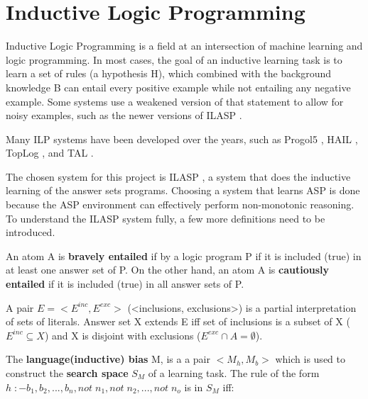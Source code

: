 
\section{Inductive Logic Programming}

Inductive Logic Programming \cite{RefWorks:RefID:42-muggleton1991inductive} is a field at an intersection of machine learning and logic programming.
In most cases, the goal of an inductive learning task is to learn a set of rules (a hypothesis H), which combined with the background knowledge B can entail every positive example while not entailing any negative example. 
Some systems use a weakened version of that statement to allow for noisy examples, such as the newer versions of ILASP \cite{RefWorks:RefID:55-law2018inductive}.

Many ILP systems have been developed over the years, such as Progol5 \cite{RefWorks:RefID:43-muggleton2000theory}, HAIL \cite{RefWorks:RefID:44-ray2003hybrid}, TopLog \cite{RefWorks:RefID:45-muggletontoplog:}, and TAL \cite{RefWorks:RefID:46-corapi2010inductive}.

The chosen system for this project is ILASP \cite{RefWorks:RefID:18-law2020ilasp}, a system that does the inductive learning of the answer sets programs.
Choosing a system that learns ASP is done because the ASP environment can effectively perform non-monotonic reasoning.\\

To understand the ILASP system fully, a few more definitions need to be introduced.

An atom A is \textbf{bravely entailed} if by a logic program P if it is included (true) in at least one answer set of P. 
On the other hand, an atom A is \textbf{cautiously entailed} if it is included (true) in all answer sets of P.

A pair $E = <E^{inc}, E^{exc}>$ (<inclusions, exclusions>) is a partial interpretation of sets of literals.
Answer set X extends E iff set of inclusions is a subset of X ($E^{inc} \subseteq X$) and X is disjoint with exclusions ($E^{exc} \cap A = \emptyset$).


The \textbf{language(inductive) bias} M, is a a pair $<M_h, M_b>$ which is used to construct the \textbf{search space} $S_M$ of a learning task.
The rule of the form  \\$ h \;{:-} b_1, b_2, ..., b_n, not\; n_1, not\; n_2, ..., not\; n_o$ is in $S_M$ iff:
 
